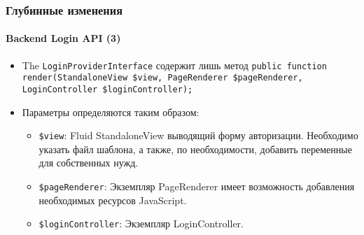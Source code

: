 \begin{frame}[fragile]
	\frametitle{Глубинные изменения}
	\framesubtitle{Backend Login API (3)}

	\begin{itemize}

		\item The \texttt{LoginProviderInterface} содержит лишь метод\newline
			\smaller\texttt{public function render(StandaloneView \$view, PageRenderer \$pageRenderer, LoginController \$loginController);}\normalsize

		\item Параметры определяются таким образом:

			\begin{itemize}

				\item \texttt{\$view}:\newline
					Fluid StandaloneView выводящий форму авторизации. Необходимо указать
					файл шаблона, а также, по необходимости, добавить переменные для собственных нужд.

				\item \texttt{\$pageRenderer}:\newline
					Экземпляр PageRenderer имеет возможность добавления необходимых ресурсов JavaScript.

				\item \texttt{\$loginController}:\newline
					Экземпляр LoginController.

			\end{itemize}

	\end{itemize}

\end{frame}


